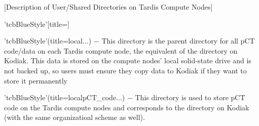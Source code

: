 \clearpage%
[Description of User/Shared Directories on Tardis Compute Nodes]
\begin{tcbenvironment}'tcbBlueStyle'[title=]%
\begin{tcbparagraph}'tcbBlueStyle'(title=\dirsep local\dirsep$\dots$)%
	$\boldsymbol{-}$ This directory is the parent directory for all pCT code/data on each Tardis compute node, the equivalent of the  directory on Kodiak.  This data is stored on the compute nodes' local solid-state drive and is not backed up, so users must ensure they copy data to Kodiak if they want to store it permanently
\end{tcbparagraph}
\begin{tcbparagraph}'tcbBlueStyle'(title=\dirsep local\dirsep pCT\_code\dirsep $\dots$)
$\boldsymbol{-}$ This directory is used to store pCT code on the Tardis compute nodes and corresponds to the  directory on Kodiak (with the same organizatioal scheme as well).
\end{tcbparagraph}

\end{tcbenvironment}
